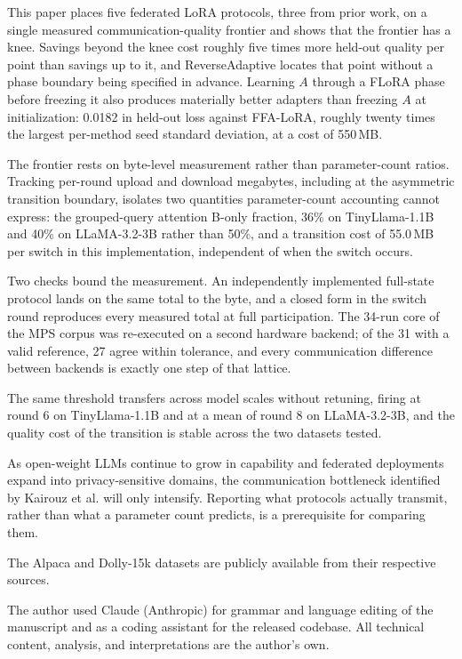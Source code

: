 \documentclass[iicol,pdflatex,sn-mathphys-num]{sn-jnl}
\begin{document}
This paper places five federated LoRA protocols, three from prior work, on a single measured communication-quality frontier and shows that the frontier has a knee. Savings beyond the knee cost roughly five times more held-out quality per point than savings up to it, and ReverseAdaptive locates that point without a phase boundary being specified in advance. Learning $A$ through a FLoRA phase before freezing it also produces materially better adapters than freezing $A$ at initialization: 0.0182 in held-out loss against FFA-LoRA, roughly twenty times the largest per-method seed standard deviation, at a cost of 550\,MB.

The frontier rests on byte-level measurement rather than parameter-count ratios. Tracking per-round upload and download megabytes, including at the asymmetric transition boundary, isolates two quantities parameter-count accounting cannot express: the grouped-query attention B-only fraction, 36\% on TinyLlama-1.1B and 40\% on LLaMA-3.2-3B rather than 50\%, and a transition cost of 55.0\,MB per switch in this implementation, independent of when the switch occurs.

Two checks bound the measurement. An independently implemented full-state protocol lands on the same total to the byte, and a closed form in the switch round reproduces every measured total at full participation. The 34-run core of the MPS corpus was re-executed on a second hardware backend; of the 31 with a valid reference, 27 agree within tolerance, and every communication difference between backends is exactly one step of that lattice.

The same threshold transfers across model scales without retuning, firing at round 6 on TinyLlama-1.1B and at a mean of round 8 on LLaMA-3.2-3B, and the quality cost of the transition is stable across the two datasets tested.

As open-weight LLMs continue to grow in capability and federated deployments expand into privacy-sensitive domains, the communication bottleneck identified by Kairouz et al. \cite{kairouz2021advances} will only intensify. Reporting what protocols actually transmit, rather than what a parameter count predicts, is a prerequisite for comparing them.

\backmatter


The Alpaca and Dolly-15k datasets are publicly available from their respective sources.

The author used Claude (Anthropic) for grammar and language editing of the manuscript and as a coding assistant for the released codebase. All technical content, analysis, and interpretations are the author's own.
\end{document}
